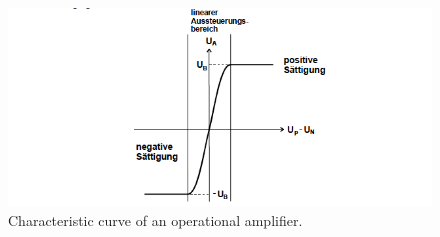 \FloatBarrier
\begin{figure}
  \centering
  \includegraphics[scale=0.5]{saturation.PNG}
  \caption{Characteristic curve of an operational amplifier. \cite{Q1}}
  \label{abb2}
\end{figure}
\FloatBarrier

